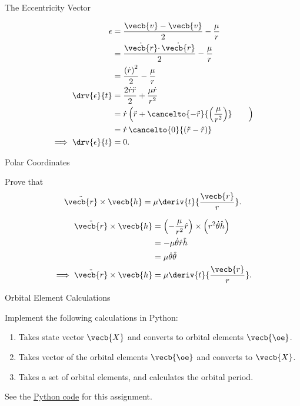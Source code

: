 \begin{hwkProblem}{1}{The Eccentricity Vector}
	\hwkPart{} \label{hwk:s01b}

	\begin{align*}
		\epsilon &= \frac{\vecb{v} - \vecb{v}}{2} - \frac{\mu}{r} \\
		\, &= \frac{\dot{\vecb{r}} \cdotp \dot{\vecb{r}}}{2} - \frac{\mu}{r} \\
		\, &= \frac{\left(\dot{r}\right)^{2}}{2} - \frac{\mu}{r} \\
		\drv{\epsilon}{t} &= \frac{2 \dot{r} \ddot{r}}{2} + \frac{\mu \dot{r}}{r^{2}} \\
		\, &= \dot{r} \left(\ddot{r} + \cancelto{- \ddot{r}}{\left(\frac{\mu}{r^{2}}\right)} \qquad \right)  \\
		\, &= \dot{r} \, \cancelto{0}{\left(\ddot{r} - \ddot{r}\right)} \\
		\implies \drv{\epsilon}{t} &= 0
	.\end{align*}

\end{hwkProblem}

\begin{hwkProblem}{2}{Polar Coordinates} \label{hwk:p02}

	Prove that \[ \ddot{\vecb{r}} \times \vecb{h} = \mu \deriv{t}{\frac{\vecb{r}}{r}} .\]

	\hwkSol{} \label{hwk:s02}

	\begin{align*}
		\ddot{\vecb{r}} \times \vecb{h} &= \left(- \frac{\mu}{r^{2}} \hat{r}\right) \times \left(r^{2} \dot{\theta} \hat{h}\right) \\
		\, &= - \mu \dot{\theta} \hat{r} \hat{h} \\
		\, &= \mu \dot{\theta} \hat{\theta} \\
		\implies \ddot{\vecb{r}} \times \vecb{h} &= \mu \deriv{t}{\frac{\vecb{r}}{r}}
	.\end{align*}

\end{hwkProblem}

\begin{hwkProblem}{3}{Orbital Element Calculations} \label{hwk:p03}

	Implement the following calculations in Python:
	\begin{enumerate}
		\item \label{hwk:p03a} Takes state vector \(\vecb{X}\) and converts to orbital elements \(\vecb{\oe}\).
		\item \label{hwk:p03b} Takes vector of the orbital elements \(\vecb{\oe}\) and converts to \(\vecb{X}\).
		\item \label{hwk:p03c} Takes a set of orbital elements, and calculates the orbital period.
	\end{enumerate}

	\hwkCode{} \label{code:s03}

	See the \href{https://www.github.com/vaisriv/enae441-hw01/blob/main/code/hw01.py}{Python code} for this assignment.

\end{hwkProblem}

